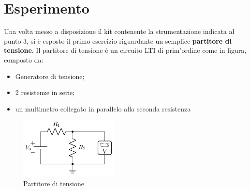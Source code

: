     \section{Esperimento}
    Una volta messo a disposizione il kit contenente la strumentazione indicata al punto $3$, %
    si è esposto il primo esercizio riguardante un semplice \textbf{partitore di tensione}.
    Il partitore di tensione è un circuito LTI di prim'ordine come in figura, composto da:
    \begin{itemize}
        \item Generatore di tensione;
        \item 2 resistenze in serie;
        \item un multimetro collegato in parallelo alla seconda resistenza
    \end{itemize}

    \begin{figure}[!h]            %
        \begin{center}
            \includegraphics[width = 5cm]{ese1.png}
            \caption{Partitore di tensione}
        \end{center}
    \end{figure}
    

